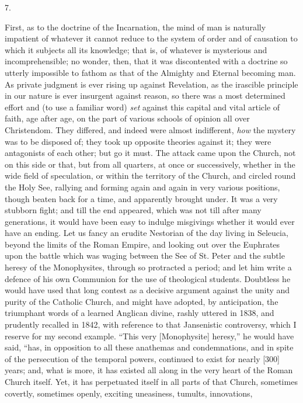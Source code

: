 7.

First, as to the doctrine of the Incarnation, the mind of man is
naturally impatient of whatever it cannot reduce to the system of
order and of causation to which it subjects all its knowledge; that
is, of whatever is mysterious and incomprehensible; no wonder, then,
that it was discontented with a doctrine so utterly impossible to
fathom as that of the Almighty and Eternal becoming man. As private
judgment is ever rising up against Revelation, as the irascible
principle in our nature is ever insurgent against reason, so there was
a most determined effort and (to use a familiar word) \emph{set}
against this capital and vital article of faith, age after age, on the
part of various schools of opinion all over Christendom. They
differed, and indeed were almost indifferent, \emph{how} the mystery
was to be disposed of; they took up opposite theories against it; they
were antagonists of each other; but go it must. The attack came upon
the Church, not on this side or that, but from all quarters, at once
or successively, whether in the wide field of speculation, or within
the territory of the Church, and circled round the Holy See, rallying
and forming again and again in very various positions, though beaten
back for a time, and apparently brought under. It was a very stubborn
fight; and till the end appeared, which was not till after many
generations, it would have been easy to indulge misgivings whether it
would ever have an ending. Let us fancy an erudite Nestorian of the
day living in Seleucia, beyond the limits of the Roman Empire, and
looking out over the Euphrates upon the battle which was waging
between the See of St. Peter and the subtle heresy of the Monophysites,
through so protracted a period; and let him write a defence of his own
Communion for the use of theological students. Doubtless he would have
used that long contest as a decisive argument against the unity and
purity of the Catholic Church, and might have adopted, by
anticipation, the triumphant words of a learned Anglican divine,
rashly uttered in 1838, and prudently recalled in 1842, with reference
to that Jansenistic controversy, which I reserve for my second
example. ``This very [Monophysite] heresy,'' he would have
said, ``has, in opposition to all these anathemas and
condemnations, and in spite of the persecution of the temporal powers,
continued to exist for nearly [300] years; and, what is more, it has
existed all along in the very heart of the Roman Church itself. Yet,
it has perpetuated itself in all parts of that Church, sometimes
covertly, sometimes openly, exciting uneasiness, tumults, innovations,
